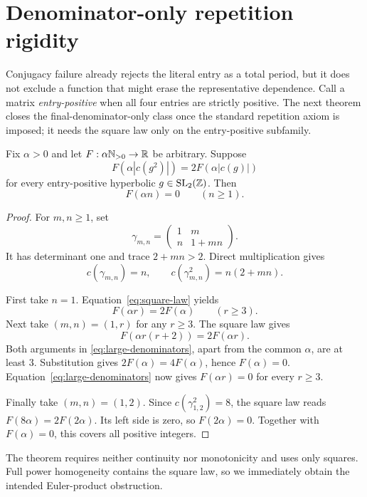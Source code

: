 \section{Denominator-only repetition rigidity}

Conjugacy failure already rejects the literal entry as a total period, but it
does not exclude a function that might erase the representative dependence.
Call a matrix \emph{entry-positive} when all four entries are strictly
positive.  The next theorem closes the final-denominator-only class once the
standard repetition axiom is imposed; it needs the square law only on the
entry-positive subfamily.

\begin{theorem}\label{thm:rigidity}
Fix $\alpha>0$ and let $F:\alpha\mathbb N_{>0}\to\mathbb R$ be arbitrary.  Suppose
\begin{equation}\label{eq:square-law}
 F(\alpha|c(g^2)|)=2F(\alpha|c(g)|)
\end{equation}
for every entry-positive hyperbolic $g\in\operatorname{SL}_2(\mathbb Z)$.  Then
\[
 F(\alpha n)=0\qquad(n\geq1).
\]
\end{theorem}

\begin{proof}
For $m,n\geq1$, set
\[
 \gamma_{m,n}=\begin{pmatrix}1&m\\n&1+mn\end{pmatrix}.
\]
It has determinant one and trace $2+mn>2$.  Direct multiplication gives
\[
 c(\gamma_{m,n})=n,\qquad
 c(\gamma_{m,n}^2)=n(2+mn).
\]

First take $n=1$.  Equation~\eqref{eq:square-law} yields
\begin{equation}\label{eq:large-denominators}
 F(\alpha r)=2F(\alpha)\qquad(r\geq3).
\end{equation}
Next take $(m,n)=(1,r)$ for any $r\geq3$.  The square law gives
\[
 F(\alpha r(r+2))=2F(\alpha r).
\]
Both arguments in \eqref{eq:large-denominators}, apart from the common
$\alpha$, are at least $3$.  Substitution gives
$2F(\alpha)=4F(\alpha)$, hence $F(\alpha)=0$.
Equation~\eqref{eq:large-denominators} now gives
$F(\alpha r)=0$ for every $r\geq3$.

Finally take $(m,n)=(1,2)$.  Since
$c(\gamma_{1,2}^2)=8$, the square law reads
$F(8\alpha)=2F(2\alpha)$.  Its left side is zero, so $F(2\alpha)=0$.
Together with $F(\alpha)=0$, this covers all positive integers.
\end{proof}

The theorem requires neither continuity nor monotonicity and uses only
squares.  Full power homogeneity contains the square law, so we immediately
obtain the intended Euler-product obstruction.

